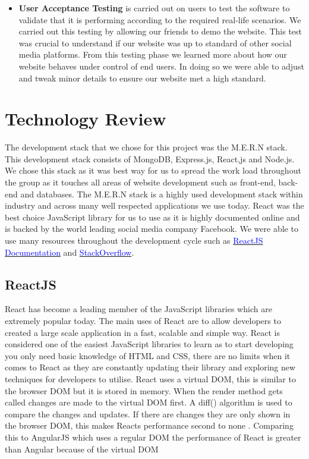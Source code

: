 \begin{itemize}
\item \textbf{User Acceptance Testing}
 is carried out on users to test the software to validate that it is performing according to the required real-life scenarios.\newline
 We carried out this testing by allowing our friends to demo the website. This test was crucial to understand if our website was up to standard of other social media platforms. From this testing phase we learned more about how our website behaves under control of end users. In doing so we were able to adjust and tweak minor details to ensure our website met a high standard.

\end{itemize}


\chapter{Technology Review}

The development stack that we chose for this project was the M.E.R.N stack. This development stack consists of MongoDB, Express.js, React,js and Node.js. We chose this stack as it was best way for us to spread the work load throughout the group as it touches all areas of website development such as front-end, back-end and databases. The M.E.R.N stack is a highly used development stack within industry and across many well respected applications we use today. React was the best choice JavaScript library for us to use as it is highly documented online and is backed by the world leading social media company Facebook. We were able to use many resources throughout the development cycle such as \href{https://reactjs.org/}{\textcolor{blue}{ReactJS Documentation}} and \href{https://stackoverflow.com/}{\textcolor{blue}{StackOverflow}}.
\newline

\section{ReactJS}
React has become a leading member of the JavaScript libraries which are extremely popular today. The main uses of React are to allow developers to created a large scale application in a fast, scalable and simple way. React is considered one of the easiest JavaScript libraries to learn as to start developing you only need basic knowledge of HTML and CSS, there are no limits when it comes to React as they are constantly updating their library and exploring new techniques for developers to utilise. 
React uses a virtual DOM, this is similar to the browser DOM but it is stored in memory. When the render method gets called changes are made to the virtual DOM first. A diff() algorithm is used to compare the changes and updates. If there are changes they are only shown in the browser DOM, this makes Reacts performance second to none \cite{aggarwal2018modern}. Comparing this to AngularJS which uses a regular DOM the performance of React is greater than Angular because of the virtual DOM \cite{kumar2016comparative}
\newline

